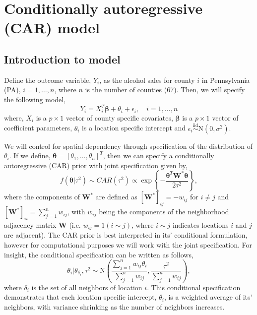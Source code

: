 \documentclass[12pt]{article} %
\theoremstyle{plain}
\theoremstyle{definition}
\theoremstyle{remark}
\begin{document}
\section*{Conditionally autoregressive (CAR) model}

\subsection*{Introduction to model}

Define the outcome variable, $Y_{i}$, as the alcohol sales for county $i$ in Pennsylvania (PA), $i=1,\ldots,n$, where $n$ is the number of counties (67). Then, we will specify the following model,
$$Y_{i}=X_{i}^T\boldsymbol{\beta}+\theta_i+\epsilon_i, \quad i=1,\ldots,n$$
where, $X_i$ is a $p \times 1$ vector of county specific covariates, $\boldsymbol{\beta}$ is a $p \times 1$ vector of coefficient parameters, $\theta_i$ is a location specific intercept and $\epsilon_i \stackrel{\text{iid}}{\sim}\text{N}\left(0,\sigma^2\right)$. 

We will control for spatial dependency through specification of the distribution of $\theta_i$. If we define, $\boldsymbol{\theta}=[\theta_1,\ldots,\theta_n]^T$, then we can specify a conditionally autoregressive (CAR) prior with joint specification given by,
$$f\left(\boldsymbol{\theta}|\tau^2\right)\sim {CAR}(\tau^2) \propto \exp\left\{-\frac{\boldsymbol{\theta}^T\mathbf{W}^*\boldsymbol{\theta}}{2\tau^2}\right\},$$
where the components of $\mathbf{W}^*$ are defined as $[\mathbf{W}^*]_{ij}=-w_{ij}$ for $i \neq j$ and $[\mathbf{W}^*]_{ii}=\sum_{j=1}^n w_{ij}$, with $w_{ij}$ being the components of the neighborhood adjacency matrix $\mathbf{W}$ (i.e. $w_{ij}=1(i\sim j)$, where $i\sim j$ indicates locations $i$ and $j$ are adjacent). The CAR prior is best interpreted in its' conditional formulation, however for computational purposes we will work with the joint specification. For insight, the conditional specification can be written as follows,
$$\theta_i | \theta_{\delta_i},\tau^2 \sim \text{N}\left(\frac{\sum_{j=1}^n w_{ij}\theta_i}{\sum_{j=1}^n w_{ij}},\frac{\tau^2}{\sum_{j=1}^n w_{ij}}\right),$$
where $\delta_i$ is the set of all neighbors of location $i$. This conditional specification demonstrates that each location specific intercept, $\theta_i$, is a weighted average of its' neighbors, with variance shrinking as the number of neighbors increases.
\end{document}
